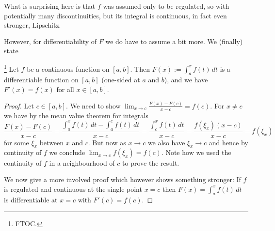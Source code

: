 \documentclass[10pt, a4paper]{article}
\begin{document}
What is surprising here is that $f$ was assumed only to be regulated,
so with potentially many discontinuities,
but its integral is continuous,
in fact even stronger,
Lipschitz.

However,
for differentiability of $F$ we do have to assume a bit more.
We
(finally)
state
\begin{theorem}\footnote{FTOC.}
    Let $f$ be a continuous function on $[a, b]$.
    Then $F(x) := \int_{a}^{x}f(t)\,dt$ is a differentiable function on $[a, b]$
    (one-sided at $a$ and $b$),
    and we have $F'(x) = f(x)$ for all $x \in [a, b]$.
    \begin{proof}
        Let $c \in [a, b]$.
        We need to show $\lim_{x \rightarrow c}\frac{F(x) - F(c)}{x - c} = f(c)$.
        For $x \neq c$ we have by the mean value theorem for integrals
        \[
        \frac{F(x) - F(c)}{x - c} = \frac{\int_{a}^{x}f(t)\,dt - \int_{a}^{c}f(t)\,dt}{x - c} = \frac{\int_{c}^{x}f(t)\,dt}{x - c} = \frac{f(\xi_x)(x - c)}{x - c} = f(\xi_x)
        \]
        for some $\xi_x$ between $x$ and $c$.
        But now as $x \rightarrow c$ we also have $\xi_x \rightarrow c$ and hence by continuity of $f$ we conclude $\lim_{x \rightarrow c}f(\xi_x) = f(c)$.
        Note how we used the continuity of $f$ in a neighbourhood of $c$ to prove the result.

        We now give a more involved proof which however shows something stronger:
        If $f$ is regulated and continuous at the single point $x = c$ then $F(x) = \int_{a}^{x}f(t)\,dt$ is differentiable at $x = c$ with $F'(c) = f(c)$.


\end{proof}
\end{theorem}
\end{document}
